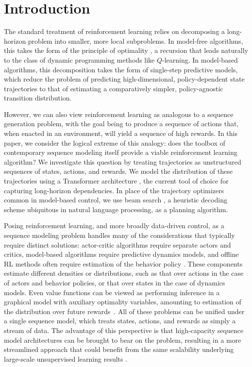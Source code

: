\section{Introduction}
\label{sec:intro}

The standard treatment of reinforcement learning relies on decomposing a long-horizon problem into smaller, more local subproblems.
In model-free algorithms, this takes the form of the principle of optimality \citep{bellman1957dynamic}, a recursion that leads naturally to the class of dynamic programming methods like $Q$-learning.
In model-based algorithms, this decomposition takes the form of single-step predictive models, which reduce the problem of predicting high-dimensional, policy-dependent state trajectories to that of estimating a comparatively simpler, policy-agnostic transition distribution.

However, we can also view reinforcement learning as analogous to a sequence generation problem, with the goal being to produce a sequence of actions that, when enacted in an environment, will yield a sequence of high rewards.
In this paper, we consider the logical extreme of this analogy: does the toolbox of contemporary sequence modeling itself provide a viable reinforcement learning algorithm?
We investigate this question by treating trajectories as unstructured sequences of states, actions, and rewards.
We model the distribution of these trajectories using a Transformer architecture \citep{vaswani2017attention}, the current tool of choice for capturing long-horizon dependencies.
In place of the trajectory optimizers common in model-based control, we use beam search \citep{reddy1997beam}, a heuristic decoding scheme ubiquitous in natural language processing, as a planning algorithm.

Posing reinforcement learning, and more broadly data-driven control, as a sequence modeling problem handles many of the considerations that typically require distinct solutions: actor-critic algorithms require separate actors and critics, model-based algorithms require predictive dynamics models, and offline RL methods often require estimation of the behavior policy \citep{fujimoto2019off}.
These components estimate different densities or distributions, such as that over actions in the case of actors and behavior policies, or that over states in the case of dynamics models.
Even value functions can be viewed as performing inference in a graphical model with auxiliary optimality variables, amounting to estimation of the distribution over future rewards~\citep{levine2018reinforcement}.
All of these problems can be unified under a single sequence model, which treats states, actions, and rewards as simply a stream of data.
The advantage of this perspective is that high-capacity sequence model architectures can be brought to bear on the problem, resulting in a more streamlined approach that could benefit from the same scalability underlying large-scale unsupervised learning results \citep{brown2020gpt3}.

